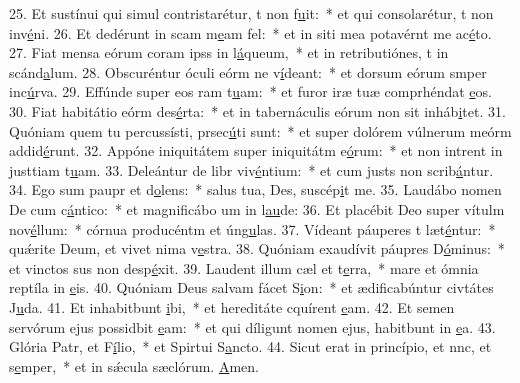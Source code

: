 25. Et sustínui qui simul contristarétur, t non f\uline{u}it:~* et qui consolarétur, t non inv\uline{é}ni.
26. Et dedérunt in scam m\uline{e}am fel:~* et in siti mea potavérnt me ac\uline{é}to.
27. Fiat mensa eórum coram ipss in l\uline{á}queum,~* et in retributiónes, t in scánd\uline{a}lum.
28. Obscuréntur óculi eórm ne v\uline{í}deant:~* et dorsum eórum smper inc\uline{ú}rva.
29. Effúnde super eos ram t\uline{u}am:~* et furor iræ tuæ comprhéndat \uline{e}os.
30. Fiat habitátio eórm des\uline{é}rta:~* et in tabernáculis eórum non sit  inháb\uline{i}tet.
31. Quóniam quem tu percussísti, prsec\uline{ú}ti sunt:~* et super dolórem vúlnerum meórm addid\uline{é}runt.
32. Appóne iniquitátem super iniquitátm e\uline{ó}rum:~* et non intrent in justtiam t\uline{u}am.
33. Deleántur de libr viv\uline{é}ntium:~* et cum justs non scrib\uline{á}ntur.
34. Ego sum paupr et d\uline{o}lens:~* salus tua, Des, suscép\uline{i}t me.
35. Laudábo nomen De cum c\uline{á}ntico:~* et magnificábo um in l\uline{au}de:
36. Et placébit Deo super vítulm nov\uline{é}llum:~* córnua producéntm et úng\uline{u}las.
37. Vídeant páuperes t læt\uline{é}ntur:~* quǽrite Deum, et vivet nima v\uline{e}stra.
38. Quóniam exaudívit páupres D\uline{ó}minus:~* et vinctos sus non desp\uline{é}xit.
39. Laudent illum cæl et t\uline{e}rra,~* mare et ómnia reptíla in \uline{e}is.
40. Quóniam Deus salvam fácet S\uline{i}on:~* et ædificabúntur civtátes J\uline{u}da.
41. Et inhabitbunt \uline{i}bi,~* et hereditáte cquírent \uline{e}am.
42. Et semen servórum ejus possidbit \uline{e}am:~* et qui díligunt nomen ejus, habitbunt in \uline{e}a.
43. Glória Patr, et F\uline{í}lio,~* et Spirtui S\uline{a}ncto.
44. Sicut erat in princípio, et nnc, et s\uline{e}mper,~* et in sǽcula sæclórum. \uline{A}men.
